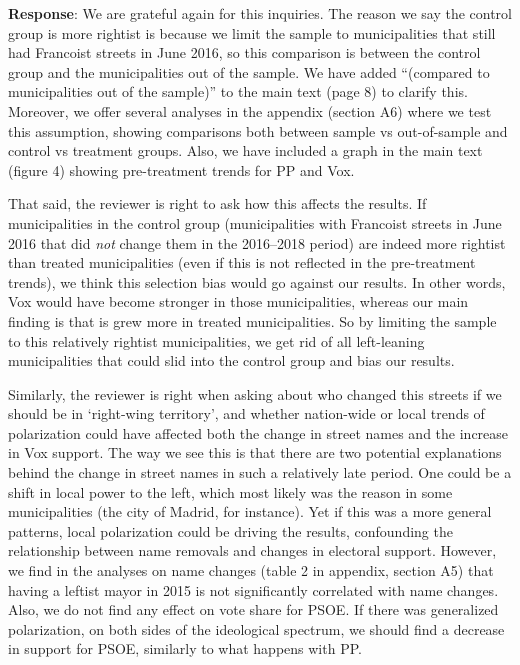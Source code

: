 \documentclass[12pt, a4paper, notitlepage]{article}
\begin{document}
\textbf{{\color{red}{CHECK}}}

\textbf{Response}: We are grateful again for this inquiries. The reason we say the control group is more rightist is because we limit the sample to municipalities that still had Francoist streets in June 2016, so this comparison is between the control group and the municipalities out of the sample. We have added ``(compared to municipalities out of the sample)'' to the main text (page 8) to clarify this.
Moreover, we offer several analyses in the appendix (section A6) where we test this assumption, showing comparisons both between sample vs out-of-sample and control vs treatment groups. Also, we have included a graph in the main text (figure 4) showing pre-treatment trends for PP and Vox.

That said, the reviewer is right to ask how this affects the results.
If municipalities in the control group (municipalities with Francoist streets in June 2016 that did \textit{not} change them in the 2016--2018 period) are indeed more rightist than treated municipalities (even if this is not reflected in the pre-treatment trends), we think this selection bias would go against our results.
In other words, Vox would have become stronger in those municipalities, whereas our main finding is that is grew more in treated municipalities.
So by limiting the sample to this relatively rightist municipalities, we get rid of all left-leaning municipalities that could slid into the control group and bias our results.

Similarly, the reviewer is right when asking about who changed this streets if we should be in `right-wing territory', and whether nation-wide or local trends of polarization could have affected both the change in street names and the increase in Vox support.
The way we see this is that there are two potential explanations behind the change in street names in such a relatively late period.
One could be a shift in local power to the left, which most likely was the reason in some municipalities (the city of Madrid, for instance).
Yet if this was a more general patterns, local polarization could be driving the results, confounding the relationship between name removals and changes in electoral support.
However, we find in the analyses on name changes (table 2 in appendix, section A5) that having a leftist mayor in 2015 is not significantly correlated with name changes.
Also, we do not find any effect on vote share for PSOE.
If there was generalized polarization, on both sides of the ideological spectrum, we should find a decrease in support for PSOE, similarly to what happens with PP.
\end{document}
